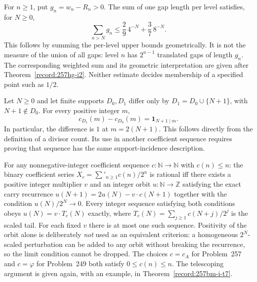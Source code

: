 \begin{lem}
\label{lem:gap-mass-summability}
For $n\ge1$, put $g_n=w_n-R_n>0$.  The sum of one gap
length per level satisfies, for $N\ge0$,
\[
 \sum_{n>N}g_n\le\frac29\,4^{-N}+\frac37\,8^{-N}.
\]
This follows by summing the per-level upper bounds geometrically.
It is not the measure of the union of all gaps: level $n$ has
$2^{n-1}$ translated gaps of length $g_n$.  The corresponding weighted
sum and its geometric interpretation are given after
Theorem~\ref{record:257hg-i2}.  Neither estimate decides membership
of a specified point such as $1/2$.
\end{lem}

\begin{lem}
\label{lem:half-divisor-unit-drop}
Let $N\ge0$ and let finite supports $D_0,D_1$ differ only by
$D_1=D_0\cup\{N+1\}$, with $N+1\notin D_0$.
For every positive integer $m$,
\[
 c_{D_1}(m)-c_{D_0}(m)=\mathbf1_{N+1\mid m}.
\]
In particular, the difference is $1$ at $m=2(N+1)$.
This follows directly from the definition of a divisor count.
Its use in another coefficient sequence requires proving that
sequence has the same support-incidence description.
\end{lem}

\begin{thm}
\label{thm:tempered-orbit-rigidity}
For any nonnegative-integer coefficient sequence $c:\mathbb N\to\mathbb N$ with $c(n)\le
n$: the binary coefficient series $X_c = \sum'_{n\ge 1} c(n)/2^n$ is rational iff there
exists a positive integer multiplier $v$ and an integer orbit $u:\mathbb N\to\mathbb Z$
satisfying the exact carry recurrence $u(N{+}1)=2u(N)-v\cdot c(N{+}1)$ together with the
condition $u(N)/2^N\to0$.  Every integer sequence satisfying both conditions obeys $u(N) = v\cdot T_c(N)$ exactly, where $T_c(N)=\sum_{j\ge 1} c(N{+}j)/2^j$ is
the scaled tail.  For each fixed $v$ there is at most one such sequence. Positivity of the orbit alone
is deliberately \emph{not} used as an equivalent criterion: a homogeneous $2^N$-scaled
perturbation can be added to any orbit without breaking the recurrence, so the limit condition cannot be dropped.  The choices $c=c_A$ for
Problem~257 and $c=\varphi$ for Problem~249 both satisfy $0\le c(n)\le n$.
The telescoping argument is given again, with an example, in
Theorem~\ref{record:257bm-i-t7}.
\end{thm}

